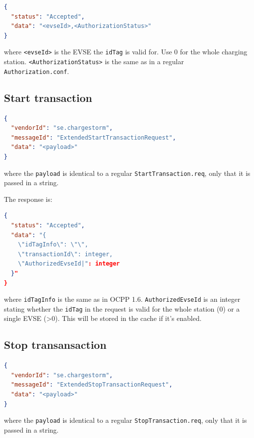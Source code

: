 \documentclass{scrartcl}
\begin{document}
\begin{lstlisting}[language=json,caption={DataTransfer.conf for
AuthorizeExtendedRequest sent to the CS},captionpos=t]
{
  "status": "Accepted",
  "data": "<evseId>,<AuthorizationStatus>"
}
\end{lstlisting}
where \verb|<evseId>| is the EVSE the \verb|idTag| is valid for. Use 0 for the
whole charging station. \verb|<AuthorizationStatus>| is the same as in a
regular \verb|Authorization.conf|.


\subsection{Start transaction}
\label{sec:start-transaction}

\begin{lstlisting}[language=json,caption={DataTransfer.req for
ExtendedStartTransactionRequest sent from the CS},captionpos=t]
{
  "vendorId": "se.chargestorm",
  "messageId": "ExtendedStartTransactionRequest",
  "data": "<payload>"
}
\end{lstlisting}
where the \verb|payload| is identical to a regular
\verb|StartTransaction.req|, only that it is passed in a string.

The response is:
\begin{lstlisting}[language=json,caption={DataTransfer.conf for
ExtendedStartTransactionRequest sent to the CS},captionpos=t]
{
  "status": "Accepted",
  "data": "{
    \"idTagInfo\": \"\",
    \"transactionId\": integer,
    \"AuthorizedEvseId|": integer
  }"
}
\end{lstlisting}
where \verb|idTagInfo| is the same as in OCPP 1.6.
\verb|AuthorizedEvseId| is an integer stating whether the \verb|idTag| in the
request is valid for the whole station (0) or a single EVSE (>0). This will be
stored in the cache if it's enabled.


\subsection{Stop transansaction}
\label{sec:stop-transansaction}

\begin{lstlisting}[language=json,caption={DataTransfer.req for
ExtendedStopTransactionRequest sent from the CS},captionpos=t]
{
  "vendorId": "se.chargestorm",
  "messageId": "ExtendedStopTransactionRequest",
  "data": "<payload>"
}
\end{lstlisting}
where the \verb|payload| is identical to a regular
\verb|StopTransaction.req|, only that it is passed in a string.
\end{document}
